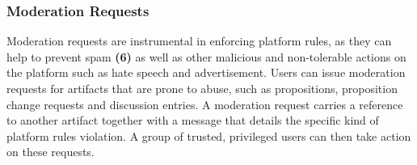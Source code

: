 
\subsubsection{Moderation Requests}
\label{ssec:Moderation_Requests}
Moderation requests are instrumental in enforcing platform rules, as they can help to prevent spam \textbf{(6)} as well as other malicious and non-tolerable actions on the platform such as hate speech and advertisement.
Users can issue moderation requests for artifacts that are prone to abuse, such as propositions, proposition change requests and discussion entries.
A moderation request carries a reference to another artifact together with a message that details the specific kind of platform rules violation.
A group of trusted, privileged users can then take action on these requests.

